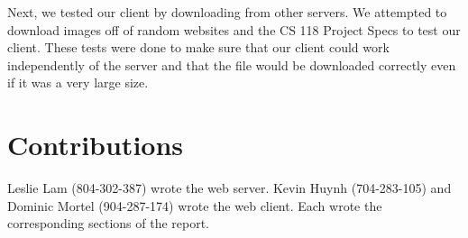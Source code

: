 \documentclass{article}
\begin{document}
    Next, we tested our client by downloading from other servers. We attempted
    to download images off of random websites and the CS 118 Project Specs to
    test our client. These tests were done to make sure that our client could
    work independently of the server and that the file would be downloaded
    correctly even if it was a very large size.

\section{Contributions}
    Leslie Lam (804-302-387) wrote the web server. Kevin Huynh (704-283-105)
    and Dominic Mortel (904-287-174) wrote the web client. Each wrote the
    corresponding sections of the report.
\end{document}
